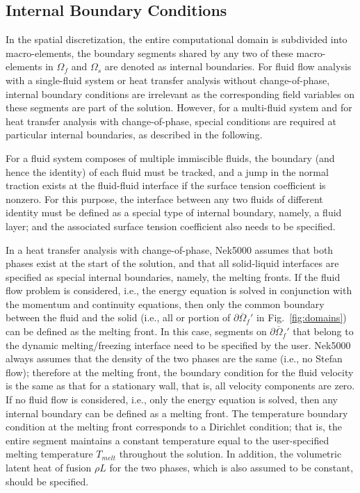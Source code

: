
\subsection{Internal Boundary Conditions}

In the spatial discretization, the entire computational
domain is subdivided into macro-elements, the boundary
segments shared by any two of these macro-elements
in $\Omega_f$ and $\Omega_s$ are denoted as internal boundaries.
For fluid flow analysis with a single-fluid system or heat
transfer analysis without change-of-phase, internal
boundary conditions are irrelevant as the corresponding
field variables on these segments are part of the
solution. However, for a multi-fluid system and for
heat transfer analysis with change-of-phase, special
conditions are required at particular internal
boundaries, as described in the following.

For a fluid system composes of multiple immiscible fluids,
the boundary (and hence the identity) of each fluid must
be tracked, and a jump in the normal traction exists
at the fluid-fluid interface if the surface tension
coefficient is nonzero.
For this purpose, the interface between any two fluids
of different identity must be defined as a special type of
internal boundary, namely, a fluid layer;
and the associated surface tension coefficient also
needs to be specified.

In a heat transfer analysis with change-of-phase, Nek5000 assumes
that both phases exist at the start of the solution, and that
all solid-liquid interfaces are specified as special internal
boundaries, namely, the melting fronts.
If the fluid flow problem is considered, i.e., the energy
equation is solved in conjunction with the momentum and
continuity equations, then only
the common boundary between the fluid and the solid
(i.e., all or portion of $\partial \overline{\Omega}_f'$ in Fig.~\ref{fig:domains})
can be defined as the melting front.
In this case, segments on $\partial \overline{\Omega}_f'$ that
belong to the dynamic melting/freezing interface need to be
specified by the user.
Nek5000 always assumes that the density of the two phases
are the same (i.e., no Stefan flow); therefore at the melting
front, the boundary condition for the fluid velocity is the
same as that for a stationary wall, that is, all velocity
components are zero.
If no fluid flow is considered, i.e., only the energy equation
is solved, then any internal boundary can be defined as
a melting front.
The temperature boundary condition at the melting front
corresponds to a Dirichlet
condition; that is, the entire segment maintains a constant temperature
equal to the user-specified melting temperature $T_{melt}$
throughout the solution.
In addition, the volumetric latent heat of fusion $\rho L$
for the two phases,
which is also assumed to be constant, should be specified.
